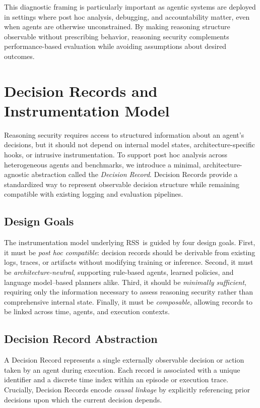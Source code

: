 \documentclass[11pt]{article}
\newcommand{\RSS}{\textsc{RSS}}
\begin{document}
This diagnostic framing is particularly important as agentic systems are deployed in settings where post hoc analysis, debugging, and accountability matter, even when agents are otherwise unconstrained. By making reasoning structure observable without prescribing behavior, reasoning security complements performance-based evaluation while avoiding assumptions about desired outcomes.

\section{Decision Records and Instrumentation Model}
Reasoning security requires access to structured information about an agent’s decisions, but it should not depend on internal model states, architecture-specific hooks, or intrusive instrumentation. To support post hoc analysis across heterogeneous agents and benchmarks, we introduce a minimal, architecture-agnostic abstraction called the \emph{Decision Record}. Decision Records provide a standardized way to represent observable decision structure while remaining compatible with existing logging and evaluation pipelines.

\subsection{Design Goals}
The instrumentation model underlying \RSS\ is guided by four design goals. First, it must be \emph{post hoc compatible}: decision records should be derivable from existing logs, traces, or artifacts without modifying training or inference. Second, it must be \emph{architecture-neutral}, supporting rule-based agents, learned policies, and language model--based planners alike. Third, it should be \emph{minimally sufficient}, requiring only the information necessary to assess reasoning security rather than comprehensive internal state. Finally, it must be \emph{composable}, allowing records to be linked across time, agents, and execution contexts.

\subsection{Decision Record Abstraction}
A Decision Record represents a single externally observable decision or action taken by an agent during execution. Each record is associated with a unique identifier and a discrete time index within an episode or execution trace. Crucially, Decision Records encode \emph{causal linkage} by explicitly referencing prior decisions upon which the current decision depends.
\end{document}
